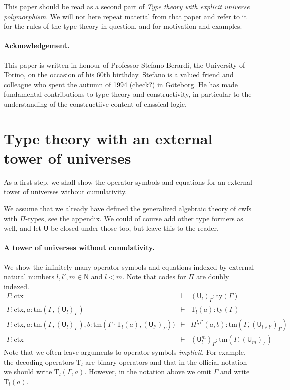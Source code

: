\documentclass[11pt,a4paper]{article}
\theoremstyle{definition}
\newcommand{\NN}{\mathsf{N}}
\newcommand{\UU}{\mathsf{U}}
\def\NN{\mathsf{N}}
\def\UU{\mathsf{U}}
\newcommand{\N}{\mathsf{N}}
\def\Pihat{\Pi}
\newcommand{\ctx}{\mathrm{ctx}}
\newcommand{\ty}{\mathrm{ty}}
\newcommand{\tm}{\mathrm{tm}}
\def\U{\mathsf{U}}
\newcommand{\Ta}{\mathrm{T}}
\begin{document}
This paper should be read as a second part of {\em Type theory with explicit universe polymorphism}. We will not here repeat material from that paper and refer to it for the rules of the type theory in question, and for motivation and examples. 

\paragraph{Acknowledgement.} This paper is written in honour of Professor Stefano Berardi, the University of Torino, on the occasion of his 60th birthday. Stefano is a valued friend and colleague who spent the autumn of 1994 (check?) in Göteborg. He has made fundamental contributions to type theory and constructivity, in particular to the understanding of the constructiive content of classical logic.

\section{Type theory with an external tower of universes}

As a first step, we shall show the operator symbols and equations for an external tower of universes without cumulativity. %

We assume that we already have defined the generalized algebraic theory of cwfs with $\Pi$-types, see the appendix. We could of course add other type formers as well, and let $\UU$ be closed under those too, but leave this to the reader. 

\paragraph{A tower of universes without cumulativity.} We show the infinitely many operator symbols and equations indexed by external natural numbers $l, l' , m \in \NN$ and $l < m$. Note that codes for $\Pi$ are doubly indexed.
\begin{eqnarray*}
\Gamma : \ctx &\vdash& (\U_{l})_\Gamma : \ty(\Gamma)\\
\Gamma : \ctx, a : \tm(\Gamma,(\U_{l})_\Gamma) &\vdash& {\Ta_{l}}(a) : \ty(\Gamma)\\
\Gamma : \ctx,
a : \tm(\Gamma,(\U_{l})_\Gamma),
b :  \tm(\Gamma \cdot \Ta_{l}(a), (\U_{l'})_\Gamma))
&\vdash&
 \Pihat^{l,l'}(a,b) : \tm(\Gamma,(\U_{l \vee l'})_\Gamma)\\
 \Gamma : \ctx&\vdash&(\UU^m_l)_\Gamma: \tm(\Gamma,(\UU_{m})_\Gamma)
\end{eqnarray*}
Note that we often leave arguments to operator symbols {\em implicit}. For example, the decoding operators $\Ta_l$ are binary operators and that in the official notation we should write $\Ta_l(\Gamma,a)$. However, in the notation above we omit $\Gamma$ and write $\Ta_l(a)$.
\end{document}
